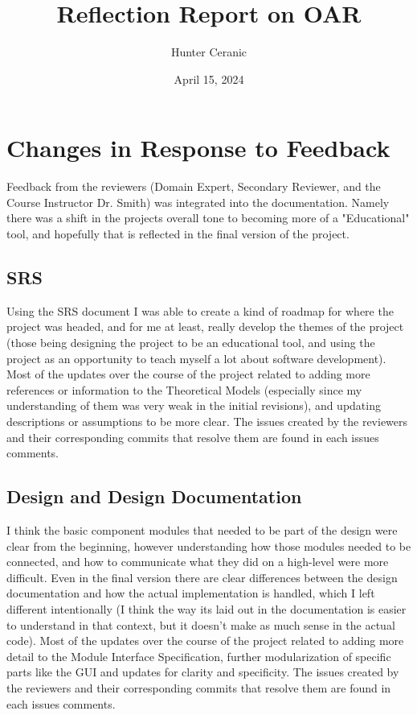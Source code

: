 \documentclass{article}
\title{Reflection Report on OAR}
\author{Hunter Ceranic}
\date{April 15, 2024}
\begin{document}
\maketitle

\section{Changes in Response to Feedback}

Feedback from the reviewers (Domain Expert, Secondary Reviewer, and the Course Instructor Dr. Smith) was integrated
into the documentation. Namely there was a shift in the projects overall tone to becoming more of a "Educational" tool,
and hopefully that is reflected in the final version of the project.

\subsection{SRS}

Using the SRS document I was able to create a kind of roadmap for where the project was headed, and for me at least, really develop the
themes of the project (those being designing the project to be an educational tool, and using the project as an opportunity to 
teach myself a lot about software development).
Most of the updates over the course of the project related to adding more
references or information to the Theoretical Models (especially since my understanding of them was very weak in the initial revisions),
and updating descriptions or assumptions to be
more clear. The issues created by the reviewers and their corresponding commits that resolve them are found in each issues comments.


\subsection{Design and Design Documentation}

I think the basic component modules that needed to be part of the design were clear from the beginning,
however understanding how those modules needed to be connected, and how to communicate what they did
on a high-level were more difficult. Even in the final version there are clear differences between the design documentation and
how the actual implementation is handled, which I left different intentionally (I think the way its laid out in the documentation
is easier to understand in that context, but it doesn't make as much sense in the actual code). Most of the updates over the course of the project related to adding more
detail to the Module Interface Specification, further modularization of specific parts like the GUI
and updates for clarity and specificity. The issues created by the reviewers and their corresponding commits that resolve them are found in each issues comments.
\end{document}
